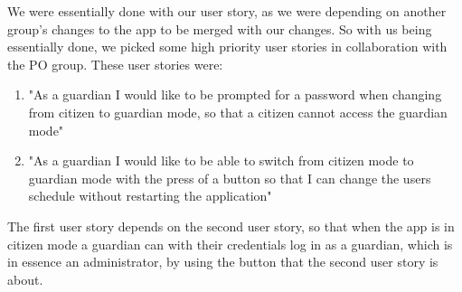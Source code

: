 We were essentially done with our user story, as we were depending on another group's changes to the app to be merged with our changes.
So with us being essentially done, we picked some high priority user stories in collaboration with the PO group.
These user stories were:

\begin{enumerate}
\item "As a guardian I would like to be prompted for a password when changing from citizen to guardian mode, so that a citizen cannot access the guardian mode"
\item "As a guardian I would like to be able to switch from citizen mode to guardian mode with the press of a button so that I can change the users schedule without restarting the application"
\end{enumerate}

The first user story depends on the second user story, so that when the app is in citizen mode a guardian can with their credentials log in as a guardian, which is in essence an administrator, by using the button that the second user story is about. 
